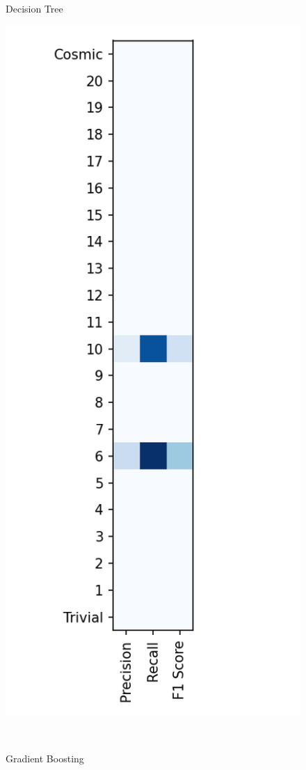 \documentclass{article}
\begin{document}
\begin{figure}[ht]
\begin{minipage}[b]{0.32\linewidth}
			\caption*{Decision Tree} 
			\vspace{10ex}
		\end{minipage}
		\begin{minipage}[b]{0.32\linewidth}
			\centering
			\includegraphics[width=\linewidth]{22 - Gradient Boosting.png} 
			\caption*{Gradient Boosting} 
			\vspace{10ex}
		\end{minipage} \\


\end{figure}
\end{document}
